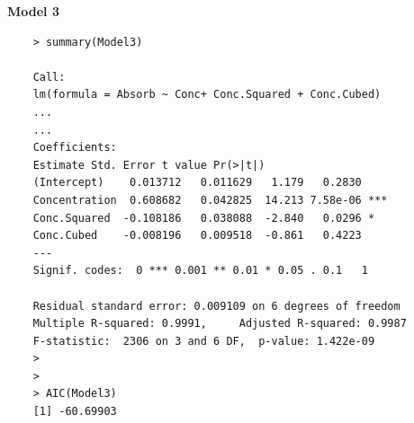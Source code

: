 \documentclass[a4paper,12pt]{article}
\begin{document}
\begin{framed}
	\noindent \textbf{Model 3}
	\begin{verbatim}
	> summary(Model3)
	
	Call:
	lm(formula = Absorb ~ Conc+ Conc.Squared + Conc.Cubed)
	...
	...
	Coefficients:
	Estimate Std. Error t value Pr(>|t|)
	(Intercept)    0.013712   0.011629   1.179   0.2830
	Concentration  0.608682   0.042825  14.213 7.58e-06 ***
	Conc.Squared  -0.108186   0.038088  -2.840   0.0296 *
	Conc.Cubed    -0.008196   0.009518  -0.861   0.4223
	---
	Signif. codes:  0 *** 0.001 ** 0.01 * 0.05 . 0.1   1
	
	Residual standard error: 0.009109 on 6 degrees of freedom
	Multiple R-squared: 0.9991,     Adjusted R-squared: 0.9987
	F-statistic:  2306 on 3 and 6 DF,  p-value: 1.422e-09
	>
	>
	> AIC(Model3)
	[1] -60.69903
	\end{verbatim}
\end{framed}
\newpage

%
%
\end{document}
